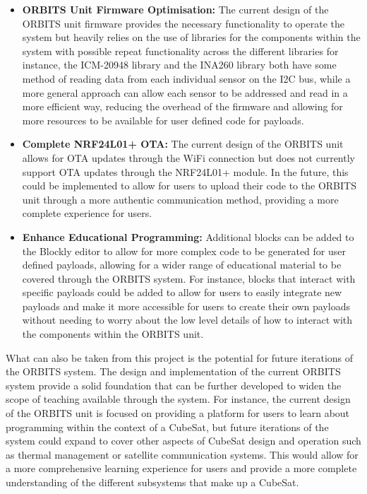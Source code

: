 \documentclass[a4paper,12pt,titlepage]{report}
\begin{document}
\begin{itemize}
    \item \textbf{ORBITS Unit Firmware Optimisation:} The current design of the ORBITS unit firmware provides the necessary functionality to operate the system but heavily relies on the use of libraries for the components within the system with possible repeat functionality across the different libraries for instance, the ICM-20948 library and the INA260 library both have some method of reading data from each individual sensor on the I2C bus, while a more general approach can allow each sensor to be addressed and read in a more efficient way, reducing the overhead of the firmware and allowing for more resources to be available for user defined code for payloads.
    \item \textbf{Complete NRF24L01+ OTA:} The current design of the ORBITS unit allows for OTA updates through the WiFi connection but does not currently support OTA updates through the NRF24L01+ module. In the future, this could be implemented to allow for users to upload their code to the ORBITS unit through a more authentic communication method, providing a more complete experience for users.
    \item \textbf{Enhance Educational Programming:} Additional blocks can be added to the Blockly editor to allow for more complex code to be generated for user defined payloads, allowing for a wider range of educational material to be covered through the ORBITS system. For instance, blocks that interact with specific payloads could be added to allow for users to easily integrate new payloads and make it more accessible for users to create their own payloads without needing to worry about the low level details of how to interact with the components within the ORBITS unit.
\end{itemize}

What can also be taken from this project is the potential for future iterations of the ORBITS system. The design and implementation of the current ORBITS system provide a solid foundation that can be further developed to widen the scope of teaching available through the system. For instance, the current design of the ORBITS unit is focused on providing a platform for users to learn about programming within the context of a CubeSat, but future iterations of the system could expand to cover other aspects of CubeSat design and operation such as thermal management or satellite communication systems. This would allow for a more comprehensive learning experience for users and provide a more complete understanding of the different subsystems that make up a CubeSat.
\end{document}
